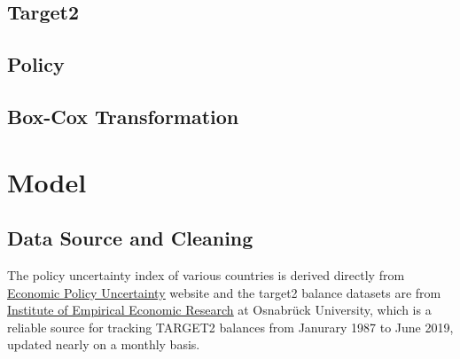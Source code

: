 \documentclass[12pt]{article}
\begin{document}
\subsection{Target2}
\subsection{Policy}
\subsection{Box-Cox Transformation}

\section{Model} \label{sec:model}
\subsection{Data Source and Cleaning}

The policy uncertainty index of various countries is derived directly from \href{https://www.policyuncertainty.com/monetary.html}{\underline{Economic Policy Uncertainty}} website and the target2 balance datasets are from \href{http://www.eurocrisismonitor.com}{\underline{Institute of Empirical Economic Research}} at Osnabrück University, which is a reliable source for tracking TARGET2 balances from Janurary 1987 to June 2019, updated nearly on a monthly basis. 
\end{document}
